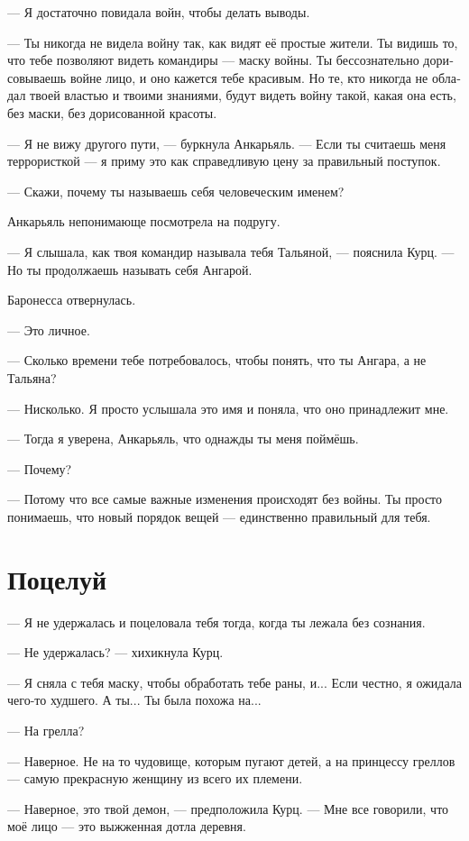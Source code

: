 \documentclass[a4paper,10pt,fleqn]{book}\usepackage{polyglossia}\setdefaultlanguage[babelshorthands=true]{russian}\setotherlanguage{english}\defaultfontfeatures{Ligatures=TeX,Mapping=tex-text}\usepackage{xcolor}\newcommand{\ml}[3]{#2}
\begin{document}
--- Я достаточно повидала войн, чтобы делать выводы.

--- Ты никогда не видела войну так, как видят её простые жители.
Ты видишь то, что тебе позволяют видеть командиры --- маску войны.
Ты бессознательно дорисовываешь войне лицо, и оно кажется тебе красивым.
Но те, кто никогда не обладал твоей властью и твоими знаниями, будут видеть войну такой, какая она есть, без маски, без дорисованной красоты.

--- Я не вижу другого пути, --- буркнула Анкарьяль.
--- Если ты считаешь меня террористкой --- я приму это как справедливую цену за правильный поступок.

--- Скажи, почему ты называешь себя человеческим именем?

Анкарьяль непонимающе посмотрела на подругу.

--- Я слышала, как твоя командир называла тебя Тальяной, --- пояснила Курц.
--- Но ты продолжаешь называть себя Ангарой.

Баронесса отвернулась.

--- Это личное.

--- Сколько времени тебе потребовалось, чтобы понять, что ты Ангара, а не Тальяна?

--- Нисколько.
Я просто услышала это имя и поняла, что оно принадлежит мне.

--- Тогда я уверена, Анкарьяль, что однажды ты меня поймёшь.

--- Почему?

--- Потому что все самые важные изменения происходят без войны.
Ты просто понимаешь, что новый порядок вещей --- единственно правильный для тебя.

\section{Поцелуй}

--- Я не удержалась и поцеловала тебя тогда, когда ты лежала без сознания.

--- Не удержалась? --- хихикнула Курц.

--- Я сняла с тебя маску, чтобы обработать тебе раны, и...
Если честно, я ожидала чего-то худшего.
А ты...
Ты была похожа на...

--- На грелла?

--- Наверное.
Не на то чудовище, которым пугают детей, а на принцессу греллов --- самую прекрасную женщину из всего их племени.

--- Наверное, это твой демон, --- предположила Курц.
--- Мне все говорили, что моё лицо --- это выжженная дотла деревня.
\end{document}
